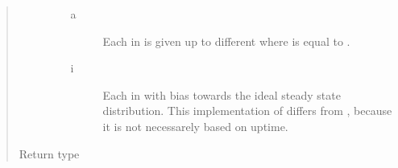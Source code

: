 \documentclass[letterpaper,10pt,english]{sphinxmanual}
\begin{document}
\begin{fulllineitems}
\begin{fulllineitems}
\begin{quote}
\begin{description}
\begin{itemize}
\begin{description}
\item[{a}] \leavevmode
Each {\hyperref[\detokenize{app.domain.helpers:app.domain.helpers.smart_dataclasses.FileBlockData}]{}}
in  is given up to  different
 where  is equal to
{\hyperref[\detokenize{app:app.environment_settings.REPLICATION_LEVEL}]{}}.

\item[{i}] \leavevmode
Each {\hyperref[\detokenize{app.domain.helpers:app.domain.helpers.smart_dataclasses.FileBlockData}]{}}
in  with bias towards the
ideal steady state distribution. This implementation of
differs from
{\hyperref[\detokenize{app.domain:app.domain.cluster_groups.Cluster.spread_files}]{}},
because it is not necessarely based on
{\hyperref[\detokenize{app.domain:app.domain.network_nodes.Node}]{}} uptime.

\end{description}


\end{itemize}

\item[{Return type}] \leavevmode
{}

\end{description}\end{quote}

\end{fulllineitems}


\end{fulllineitems}

\end{document}
